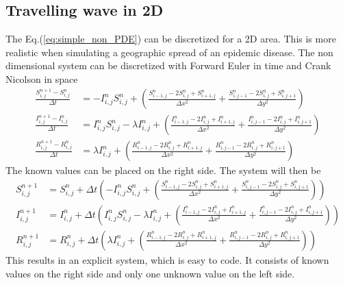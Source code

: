 \documentclass[%
twoside,                 %
final,                   %
chapterprefix=true,      %
open=right               %
10pt]{book}
\begin{document}
\subsection{Travelling wave in 2D}
The Eq.(\ref{eq:simple_non_PDE}) can be discretized for a 2D area. This is more realistic when simulating a geographic spread of an epidemic disease. The non dimensional system  can be discretized with Forward Euler in time and Crank Nicolson in space
\begin{equation} \label{eq:SIR_disc}
	\begin{aligned}
    \frac{S^{n+1}_{i,j}-S^n_{i,j}}{\Delta t} &= -I^{n}_{i,j}S^{n}_{i,j} + \left(\frac{S^{n}_{i-1,j}-2S^{n}_{i,j}+S^{n}_{i+1,j}}{\Delta x^2}+\frac{S^{n}_{i,j-1}-2S^{n}_{i,j}+S^{n}_{i,j+1}}{\Delta y^2}\right) \\
    \frac{I^{n+1}_{i,j}-I^n_{i,j}}{\Delta t} &= I^{n}_{i,j}S^{n}_{i,j} -\lambda I^{n}_{i,j} + \left(\frac{I^{n}_{i-1,j}-2I^{n}_{i,j}+I^{n}_{i+1,j}}{\Delta x^2}+\frac{I^{n}_{i,j-1}-2I^{n}_{i,j}+I^{n}_{i,j+1}}{\Delta y^2}\right) \\
    \frac{R^{n+1}_{i,j}-R^n_{i,j}}{\Delta t} &= \lambda I^{n}_{i,j}+\left(\frac{R^{n}_{i-1,j}-2R^{n}_{i,j}+R^{n}_{i+1,j}}{\Delta x^2}+\frac{R^{n}_{i,j-1}-2R^{n}_{i,j}+R^{n}_{i,j+1}}{\Delta y^2}\right) 
	\end{aligned}
\end{equation}
The known values can be placed on the right side. The system will then be
\begin{equation}
	\begin{aligned}
    S^{n+1}_{i,j} &= S^{n}_{i,j}+\Delta t\left(-I^{n}_{i,j}S^{n}_{i,j} + \left(\frac{S^{n}_{i-1,j}-2S^{n}_{i,j}+S^{n}_{i+1,j}}{\Delta x^2}+\frac{S^{n}_{i,j-1}-2S^{n}_{i,j}+S^{n}_{i,j+1}}{\Delta y^2}\right)\right) \\
    I^{n+1}_{i,j} &= I^{n}_{i,j}+\Delta t\left(I^{n}_{i,j}S^{n}_{i,j} -\lambda I^{n}_{i,j} + \left(\frac{I^{n}_{i-1,j}-2I^{n}_{i,j}+I^{n}_{i+1,j}}{\Delta x^2}+\frac{I^{n}_{i,j-1}-2I^{n}_{i,j}+I^{n}_{i,j+1}}{\Delta y^2}\right)\right) \\
    R^{n+1}_{i,j} &= R^{n}_{i,j}+\Delta t\left(\lambda I^{n}_{i,j}+\left(\frac{R^{n}_{i-1,j}-2R^{n}_{i,j}+R^{n}_{i+1,j}}{\Delta x^2}+\frac{R^{n}_{i,j-1}-2R^{n}_{i,j}+R^{n}_{i,j+1}}{\Delta y^2}\right)\right) 
	\end{aligned}
\end{equation}
This results in an explicit system, which is easy to code. It consists of known values on the right side and only one unknown value on the left side.
\end{document}
